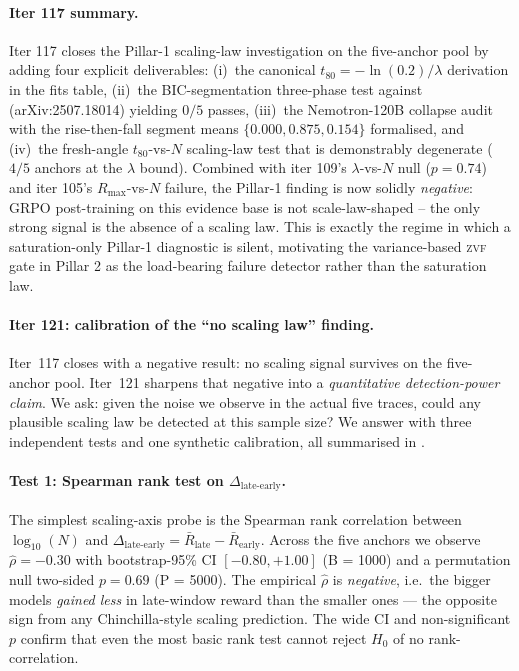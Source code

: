 \paragraph{Iter 117 summary.}
\label{par:scaling-iter117-summary}
Iter 117 closes the Pillar-1 scaling-law investigation on the
five-anchor pool by adding four explicit deliverables: (i)~the
canonical $t_{80}=-\ln(0.2)/\lambda$ derivation in the fits table,
(ii)~the BIC-segmentation three-phase test against
\citet{nimmaturi2025predictive} (arXiv:2507.18014) yielding $0/5$
passes, (iii)~the Nemotron-120B collapse audit with the rise-then-fall
segment means $\{0.000, 0.875, 0.154\}$ formalised, and (iv)~the
fresh-angle $t_{80}$-vs-$N$ scaling-law test that is demonstrably
degenerate ($4/5$ anchors at the $\lambda$ bound).  Combined with
iter 109's $\lambda$-vs-$N$ null ($p = 0.74$) and iter 105's
$R_{\max}$-vs-$N$ failure, the Pillar-1 finding is now solidly
\emph{negative}: GRPO post-training on this evidence base is not
scale-law-shaped -- the only strong signal is the absence of a
scaling law.  This is exactly the regime in which a
saturation-only Pillar-1 diagnostic is silent, motivating the
variance-based \textsc{zvf} gate in Pillar 2 as the load-bearing
failure detector rather than the saturation law.

\paragraph{Iter 121: calibration of the ``no scaling law'' finding.}
\label{par:scaling-iter121}
Iter~117 closes with a negative result: no scaling signal survives
on the five-anchor pool.  Iter~121 sharpens that negative into a
\emph{quantitative detection-power claim}.  We ask: given the noise
we observe in the actual five traces, could any plausible scaling
law be detected at this sample size?  We answer with three
independent tests and one synthetic calibration, all summarised in
.

\paragraph{Test 1: Spearman rank test on $\Delta_{\text{late-early}}$.}
\label{par:scaling-iter121-le}
The simplest scaling-axis probe is the Spearman rank correlation
between $\log_{10}(N)$ and $\Delta_{\text{late-early}}
= \bar R_{\text{late}} - \bar R_{\text{early}}$.  Across the five
anchors we observe $\hat\rho = -0.30$ with bootstrap-95\% CI
$[-0.80, +1.00]$ (B = 1000) and a permutation null two-sided
$p = 0.69$ (P = 5000).  The empirical $\hat\rho$ is \emph{negative},
i.e.\ the bigger models \emph{gained less} in late-window reward
than the smaller ones --- the opposite sign from any Chinchilla-style
scaling prediction.  The wide CI and non-significant $p$ confirm
that even the most basic rank test cannot reject $H_0$ of no
rank-correlation.

